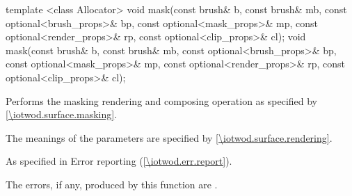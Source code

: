 %
\begin{itemdecl}
template <class Allocator>
void mask(const brush& b, const brush& mb,
  const optional<brush_props>& bp,
  const optional<mask_props>& mp,
  const optional<render_props>& rp,
  const optional<clip_props>& cl);
void mask(const brush& b, const brush& mb,
  const optional<brush_props>& bp,
  const optional<mask_props>& mp,
  const optional<render_props>& rp,
  const optional<clip_props>& cl);
\end{itemdecl}
\begin{itemdescr}
\pnum
\effects
Performs the masking rendering and composing operation as specified by \ref{\iotwod.surface.masking}.

\pnum
The meanings of the parameters are specified by \ref{\iotwod.surface.rendering}.

\pnum
\throws
As specified in Error reporting (\ref{\iotwod.err.report}).

\pnum
\errors

The errors, if any, produced by this function are .
\end{itemdescr}
